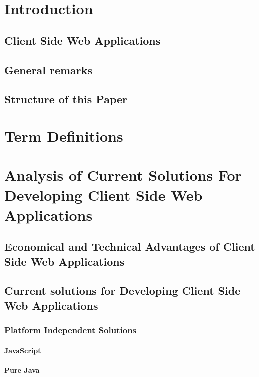 

\tableofcontents
\newpage


\section{Introduction}
 
 
 \subsection{Client Side Web Applications}
 \subsection{General remarks}
 \subsection{Structure of this Paper}
\section{Term Definitions}
\section{Analysis of Current Solutions For Developing Client Side Web Applications}
 \subsection{Economical and Technical Advantages of Client Side Web Applications}
 \subsection{Current solutions for Developing Client Side Web Applications}

  

  \subsubsection{Platform Independent Solutions}
  
   
   
   \paragraph{JavaScript}
   
    
    
   \paragraph{Pure Java}
   
